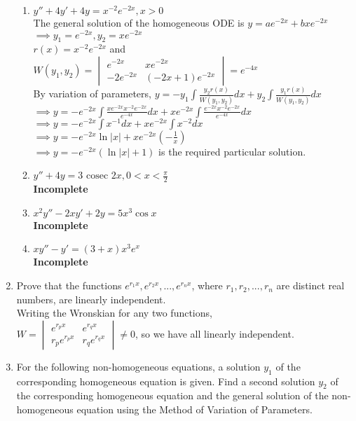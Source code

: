\documentclass[a4paper]{article}
\begin{document}
\begin{enumerate}
\begin{enumerate}
	\item $y''+4y'+4y=x^{-2}e^{-2x}, x>0$\\
	The general solution of the homogeneous ODE is $y=ae^{-2x}+bxe^{-2x}$\\
	$\implies y_1=e^{-2x}, y_2=xe^{-2x}$\\
	$r(x)=x^{-2}e^{-2x}$ and $W(y_1,y_2)=\begin{vmatrix}
	e^{-2x}  & xe^{-2x}\\
	-2e^{-2x} & (-2x+1)e^{-2x}
	\end{vmatrix} = e^{-4x}$\\
	By variation of parameters, $y=-y_1\int \frac{y_2 r(x)}{W(y_1,y_2)} dx + y_2\int \frac{y_1 r(x)}{W(y_1,y_2)}dx$\\
	$\implies y=-e^{-2x}\int \frac{xe^{-2x} x^{-2}e^{-2x}}{e^{-4x}} dx + xe^{-2x}\int \frac{e^{-2x} x^{-2}e^{-2x}}{e^{-4x}}dx$\\
	$\implies y=-e^{-2x}\int x^{-1} dx + xe^{-2x}\int x^{-2}dx$\\
	$\implies y=-e^{-2x}\ln |x| + xe^{-2x}(-\frac{1}{x})$\\
	$\implies y=-e^{-2x}(\ln |x| + 1 )$ is the required particular solution.
	
	\item $y''+4y=3\text{ cosec }2x, 0<x<\frac{\pi}{2}$ \\ \textbf{Incomplete}
	\item $x^2y''-2xy'+2y=5x^3\cos x$ \\ \textbf{Incomplete}
	\item $xy''-y'=(3+x)x^3e^x$ \\ \textbf{Incomplete}
\end{enumerate}

\item Prove that the functions $e^{r_1x},e^{r_2x},...,e^{r_nx}$, where $r_1, r_2,...,r_n$ are distinct real numbers, are linearly independent.\\
Writing the Wronskian for any two functions,\\
$W=\begin{vmatrix}
e^{r_px} & e^{r_qx}\\
r_pe^{r_px} & r_qe^{r_qx}
\end{vmatrix} \neq 0 $, so we have all linearly independent.

\item For the following non-homogeneous equations, a solution $y_1$ of the corresponding homogeneous equation is given. Find a second solution $y_2$ of the corresponding homogeneous equation and the general solution of the non-homogeneous equation using the Method of Variation of Parameters.\\


\end{enumerate}
\end{document}
